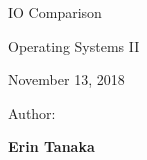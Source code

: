 \begin{titlepage}
\label{titlepage}
    \begin{singlespace}
		\hfill  
        \par\vspace{.2in}
        \centering
        \scshape{
            \vspace{.3in}
            \Huge{IO Comparison}\par  
            \vspace{.3in}
            \large Operating Systems II\par
            \vspace{.1in}
            \large November 13, 2018\par
            \vspace{.5in}
            \Large Author:\par\vspace{.1in} 
            \textbf{\LARGE Erin Tanaka}\par\vspace{.07in} 
            \vspace{1.4in}
            \par
        }
    \end{singlespace}
            

\end{titlepage}

